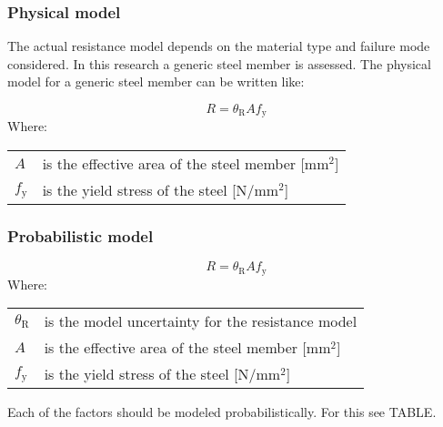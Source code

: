 \subsubsection{Physical model}
The actual resistance model depends on the material type and failure mode considered. In this research a generic steel member is assessed. 
The physical model for a generic steel member can be written like:

\begin{equation}
R = \theta_{\mathrm{R}} A f_{\mathrm{y}}
\end{equation}
Where:\\
\vspace{0.2cm}
\begin{tabular}{l l}
$A$ & is the effective area of the steel member [mm$^2$] \\
$f_{\mathrm{y}}$ & is the yield stress of the steel [N/mm$^2$]
\end{tabular}

\subsubsection{Probabilistic model}

\begin{equation}
R = \theta_{\mathrm{R}} A f_{\mathrm{y}}
\end{equation}
Where:\\
\vspace{0.2cm}
\begin{tabular}{l l}
$\theta_{\mathrm{R}}$ & is the model uncertainty for the resistance model \\
$A$ & is the effective area of the steel member [mm$^2$] \\
$f_{\mathrm{y}}$ & is the yield stress of the steel [N/mm$^2$]
\end{tabular}

Each of the factors should be modeled probabilistically. For this see TABLE. 

